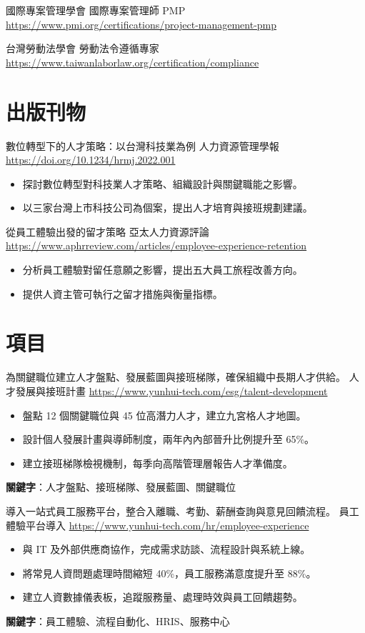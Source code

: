 \documentclass[a4paper, serif, 10pt]{moderncv}
\begin{document}
        {國際專案管理學會}
        {國際專案管理師 PMP}
        {\url{https://www.pmi.org/certifications/project-management-pmp}}
        {}
        {}

        {台灣勞動法學會}
        {勞動法令遵循專家}
        {\url{https://www.taiwanlaborlaw.org/certification/compliance}}
        {}
        {}
\section{出版刊物}

        {數位轉型下的人才策略：以台灣科技業為例}
        {人力資源管理學報}
        {\url{https://doi.org/10.1234/hrmj.2022.001}}
        {}
        {\begin{itemize}
\item 探討數位轉型對科技業人才策略、組織設計與關鍵職能之影響。
\item 以三家台灣上市科技公司為個案，提出人才培育與接班規劃建議。
\end{itemize}}

        {從員工體驗出發的留才策略}
        {亞太人力資源評論}
        {\url{https://www.aphrreview.com/articles/employee-experience-retention}}
        {}
        {\begin{itemize}
\item 分析員工體驗對留任意願之影響，提出五大員工旅程改善方向。
\item 提供人資主管可執行之留才措施與衡量指標。
\end{itemize}}
\section{項目}

        {為關鍵職位建立人才盤點、發展藍圖與接班梯隊，確保組織中長期人才供給。}
        {人才發展與接班計畫}
        {\url{https://www.yunhui-tech.com/esg/talent-development}}
        {}
        {\begin{itemize}
\item 盤點 12 個關鍵職位與 45 位高潛力人才，建立九宮格人才地圖。
\item 設計個人發展計畫與導師制度，兩年內內部晉升比例提升至 65\%。
\item 建立接班梯隊檢視機制，每季向高階管理層報告人才準備度。
\end{itemize}
\textbf{關鍵字}：人才盤點、接班梯隊、發展藍圖、關鍵職位}

        {導入一站式員工服務平台，整合入離職、考勤、薪酬查詢與意見回饋流程。}
        {員工體驗平台導入}
        {\url{https://www.yunhui-tech.com/hr/employee-experience}}
        {}
        {\begin{itemize}
\item 與 IT 及外部供應商協作，完成需求訪談、流程設計與系統上線。
\item 將常見人資問題處理時間縮短 40\%，員工服務滿意度提升至 88\%。
\item 建立人資數據儀表板，追蹤服務量、處理時效與員工回饋趨勢。
\end{itemize}
\textbf{關鍵字}：員工體驗、流程自動化、HRIS、服務中心}
\end{document}
